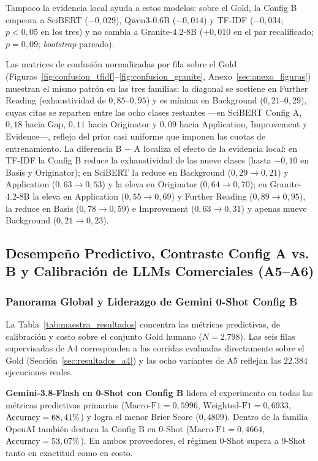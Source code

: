 \documentclass[conference]{IEEEtran}
\newcommand{\pct}{\mbox{\symbol{37}}}
\begin{document}
Tampoco la evidencia local ayuda a estos modelos: sobre el Gold, la Config B empeora a SciBERT ($-0,029$), Qwen3-0.6B ($-0,014$) y TF-IDF ($-0,034$; $p<0,05$ en los tres) y no cambia a Granite-4.2-8B ($+0,010$ en el par recalificado; $p=0,09$; \textit{bootstrap} pareado).

Las matrices de confusión normalizadas por fila sobre el Gold (Figuras~\ref{fig:confusion_tfidf}--\ref{fig:confusion_granite}, Anexo~\ref{sec:anexo_figuras}) muestran el mismo patrón en las tres familias: la diagonal se sostiene en Further Reading (exhaustividad de $0,85\text{--}0,95$) y es mínima en Background ($0,21\text{--}0,29$), cuyas citas se reparten entre las ocho clases restantes ---en SciBERT Config A, $0,18$ hacia Gap, $0,11$ hacia Originator y $0,09$ hacia Application, Improvement y Evidence---, reflejo del prior casi uniforme que imponen las cuotas de entrenamiento. La diferencia B $-$ A localiza el efecto de la evidencia local: en TF-IDF la Config B reduce la exhaustividad de las nueve clases (hasta $-0,10$ en Basis y Originator); en SciBERT la reduce en Background ($0,29 \to 0,21$) y Application ($0,63 \to 0,53$) y la eleva en Originator ($0,64 \to 0,70$); en Granite-4.2-8B la eleva en Application ($0,55 \to 0,69$) y Further Reading ($0,89 \to 0,95$), la reduce en Basis ($0,78 \to 0,59$) e Improvement ($0,63 \to 0,31$) y apenas mueve Background ($0,21 \to 0,23$).

\subsection{Desempeño Predictivo, Contraste Config A vs. B y Calibración de LLMs Comerciales (A5--A6)}
\label{sec:resultados_a5}

\subsubsection{Panorama Global y Liderazgo de Gemini 0-Shot Config B}

La Tabla~\ref{tab:maestra_resultados} concentra las métricas predictivas, de calibración y costo sobre el conjunto Gold humano ($N = 2.798$). Las seis filas supervisadas de A4 corresponden a las corridas evaluadas directamente sobre el Gold (Sección~\ref{sec:resultados_a4}) y las ocho variantes de A5 reflejan las $22.384$ ejecuciones reales.

\textbf{Gemini-3.8-Flash en 0-Shot con Config B} lidera el experimento en todas las métricas predictivas primarias ($\text{Macro-F1} = 0,5996$, $\text{Weighted-F1} = 0,6933$, $\text{Accuracy} = 68,41\pct{}$) y logra el menor Brier Score ($0,4809$). Dentro de la familia OpenAI también destaca la Config B en 0-Shot ($\text{Macro-F1} = 0,4664$, $\text{Accuracy} = 53,07\pct{}$). En ambos proveedores, el régimen 0-Shot supera a 9-Shot tanto en exactitud como en costo.
\end{document}
